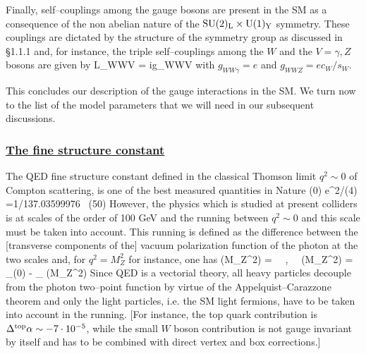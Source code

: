 Finally, self--couplings among the gauge bosons are present in the SM as a 
consequence
of the non abelian nature of the ${\rm SU(2)_L\times U(1)_Y}$ symmetry. These
couplings are dictated by the structure of the symmetry group as discussed
in \S1.1.1 and, for instance, the triple self--couplings among the $W$ and the 
$V=\gamma,Z$ bosons are given by
\beq
{\cal L}_{WWV} = ig_{WWV}  \label{WWVcoupling}
\eeq
with $g_{WW\gamma}=e$ and $g_{WWZ}=e c_W/s_W$.\s

This concludes our description of the gauge interactions in the SM. We turn now
to the list of the model parameters that we will need in our subsequent 
discussions.   

\subsubsection*{\underline{The fine structure constant}}
 
The QED fine structure constant  defined in the classical Thomson limit 
$q^2 \sim 0$ of Compton scattering, is one of the best measured quantities
in Nature
\beq
\alpha (0) \equiv e^2/(4\pi) =1/137.03599976 \, (50)
\eeq
However, the physics which is studied at present colliders is at scales of 
the order of 100 GeV and the  running between $q^2 \sim 0$ and this 
scale must be taken into account. This running is defined as the difference 
between the [transverse components of the] vacuum polarization function of the 
photon at the two scales and, for $q^2=M_Z^2$ for instance, one has
\beq
\alpha(M_Z^2) =   \ \ , \ \ 
\Delta \alpha (M_Z^2) = \Pi_{\gamma \gamma}(0) - \Pi_{\gamma \gamma} (M_Z^2)
\eeq
Since QED is a vectorial theory, all heavy particles decouple from the photon
two--point function by virtue of the Appelquist--Carazzone theorem 
\cite{decoupling-theorem} and only the light particles, i.e. the SM light 
fermions, have to be taken into account in the running. [For instance, the top
quark contribution is $\Delta^{\rm top} \alpha \sim - 7 \cdot 10^{-5}$, while 
the small $W$ boson contribution is not gauge invariant by itself and has to be
combined with direct vertex and box corrections.] \s

